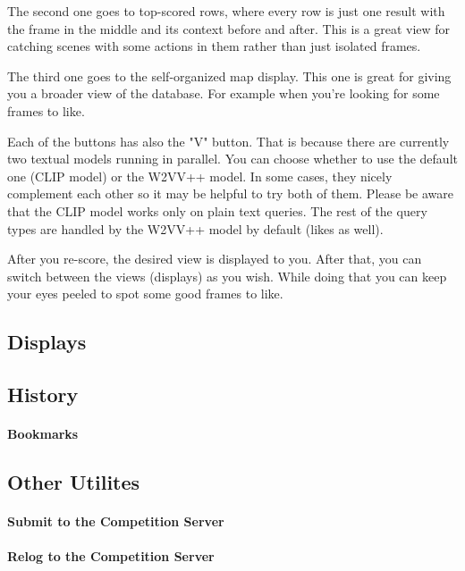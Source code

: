 The second one goes to top-scored rows, where every row is just one result with the frame in the middle and its context before and after. This is a great view for catching scenes with some actions in them rather than just isolated frames.

The third one goes to the self-organized map display. This one is great for giving you a broader view of the database. For example when you're looking for some frames to like.

Each of the buttons has also the "V" button. That is because there are currently two textual models running in parallel. You can choose whether to use the default one (CLIP model) or the W2VV++ model. In some cases, they nicely complement each other so it may be helpful to try both of them. Please be aware that the CLIP model works only on plain text queries. The rest of the query types are handled by the W2VV++ model by default (likes as well).

After you re-score, the desired view is displayed to you. After that, you can switch between the views (displays) as you wish. While doing that you can keep your eyes peeled to spot some good frames to like.

\subsection{Displays}

\subsection{History}

\paragraph{Bookmarks}

\subsection{Other Utilites}
\paragraph{Submit to the Competition Server}

\paragraph{Relog to the Competition Server}





